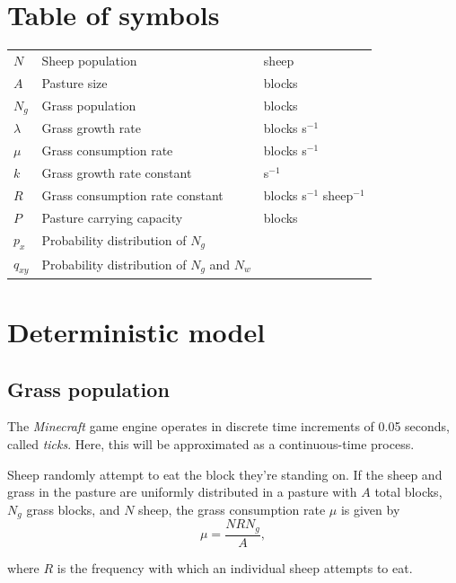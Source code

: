 \documentclass{article}
\theoremstyle{theorem}
\theoremstyle{definition}
\begin{document}
\section{Table of symbols}
\begin{center}
    \begin{tabular}{|l|l|l|}
        \hline
        $N$ & Sheep population & sheep\\
        $A$ & Pasture size & blocks\\
        $N_g$ & Grass population & blocks\\
        $\lambda$ & Grass growth rate & blocks s$^{-1}$\\
        $\mu$ & Grass consumption rate & blocks s$^{-1}$\\
        $k$ & Grass growth rate constant & s$^{-1}$\\
        $R$ & Grass consumption rate constant & blocks s$^{-1}$ sheep$^{-1}$\\
        $P$ & Pasture carrying capacity & blocks\\
        $p_x$ & Probability distribution of $N_g$ & \\
        $q_{xy}$ & Probability distribution of $N_g$ and $N_w$ & \\
        \hline
    \end{tabular}
\end{center}

\section{Deterministic model}
\subsection{Grass population}

The \textit{Minecraft} game engine operates in discrete time increments of 0.05 seconds, called \textit{ticks}. Here, this will be approximated as a continuous-time process.

Sheep randomly attempt to eat the block they're standing on. If the sheep and grass in the pasture are uniformly distributed in a pasture with $A$ total blocks, $N_g$ grass blocks, and $N$ sheep, the grass consumption rate $\mu$ is given by
\begin{equation}
    \label{sheep_eat}
    \mu=\frac{NRN_g}{A},
\end{equation}

where $R$ is the frequency with which an individual sheep attempts to eat.
\end{document}
